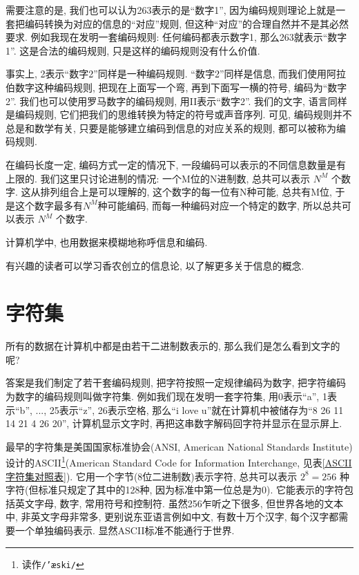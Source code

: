         需要注意的是, 我们也可以认为263表示的是``数字1'', 因为编码规则理论上就是一套把编码转换为对应的信息的``对应''规则, 但这种``对应''的合理自然并不是其必然要求. 例如我现在发明一套编码规则: 任何编码都表示数字1, 那么263就表示``数字1''. 这是合法的编码规则, 只是这样的编码规则没有什么价值.

        事实上, 2表示``数字2''同样是一种编码规则. ``数字2''同样是信息, 而我们使用阿拉伯数字这种编码规则, 把现在上面写一个弯, 再到下面写一横的符号, 编码为``数字2''. 我们也可以使用罗马数字的编码规则, 用II表示``数字2''. 我们的文字, 语言同样是编码规则, 它们把我们的思维转换为特定的符号或声音序列. 可见, 编码规则并不总是和数学有关, 只要是能够建立编码到信息的对应关系的规则, 都可以被称为编码规则.

        在编码长度一定, 编码方式一定的情况下, 一段编码可以表示的不同信息数量是有上限的. 我们这里只讨论进制的情况: 一个M位的N进制数, 总共可以表示 $ N^M $ 个数字. 这从排列组合上是可以理解的, 这个数字的每一位有N种可能, 总共有M位, 于是这个数字最多有$ N^M $种可能编码, 而每一种编码对应一个特定的数字, 所以总共可以表示 $ N^M $ 个数字.

        计算机学中, 也用数据来模糊地称呼信息和编码. 
        
        有兴趣的读者可以学习香农创立的信息论, 以了解更多关于信息的概念.

    \section{字符集} \label{字符集}
        所有的数据在计算机中都是由若干二进制数表示的, 那么我们是怎么看到文字的呢? 

        答案是我们制定了若干套编码规则, 把字符按照一定规律编码为数字, 把字符编码为数字的编码规则叫做字符集. 例如我们现在发明一套字符集, 用0表示``a'', 1表示``b'', ..., 25表示``z'', 26表示空格, 那么``i love u''就在计算机中被储存为``8 26 11 14 21 4 26 20'', 计算机显示文字时, 再把这串数字解码回字符并显示在显示屏上.

        最早的字符集是美国国家标准协会(ANSI, American National Standards Institute)设计的ASCII\footnote{读作\texttt{/'æski/}}(American Standard Code for Information Interchange, 见表\ref{ASCII字符集对照表}). 它用一个字节(8位二进制数)表示字符, 总共可以表示 $ 2 ^ 8 = 256 $ 种字符(但标准只规定了其中的128种, 因为标准中第一位总是为0). 它能表示的字符包括英文字母, 数字, 常用符号和控制符. 虽然256乍听之下很多, 但世界各地的文本中, 非英文字母非常多, 更别说东亚语言例如中文, 有数十万个汉字, 每个汉字都需要一个单独编码表示. 显然ASCII标准不能通行于世界.

